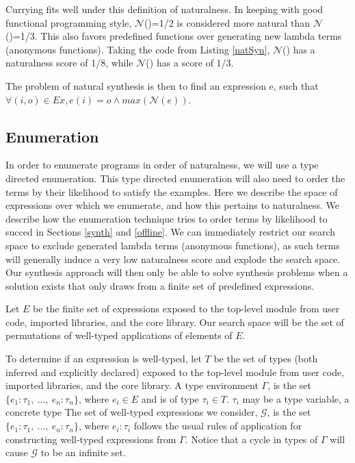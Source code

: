 Currying fits well under this definition of naturalness.
In keeping with good functional programming style, $\mathcal{N}$()=1/2 is considered more natural than $\mathcal{N}$()=1/3.
This also favors predefined functions over generating new lambda terms (anonymous functions).
Taking the code from Listing \ref{natSyn}, $\mathcal{N}$() has a naturalness score of 1/8, while $\mathcal{N}$() has a score of 1/3.

The problem of natural synthesis is then to find an expression e, such that $\forall (i,o) \in Ex, e (i) = o \land max(\mathcal{N}(e))$.


\subsection{Enumeration}
In order to enumerate programs in order of naturalness, we will use a type directed enumeration.
This type directed enumeration will also need to order the terms by their likelihood to satisfy the examples.
Here we describe the space of expressions over which we enumerate, and how this pertains to naturalness.
We describe how the enumeration technique tries to order terms by likelihood to succed in Sections \ref{synth} and \ref{offline}.
We can immediately restrict our search space to exclude generated lambda terms (anonymous functions), as such terms will generally induce a very low naturalness score and explode the search space.
Our synthesis approach will then only be able to solve synthesis problems when a solution exists that only draws from a finite set of predefined expressions.

Let $E$ be the finite set of expressions exposed to the top-level module from user code, imported libraries, and the core library.
Our search space will be the set of permutations of well-typed applications of elements of $E$.

To determine if an expression is well-typed, let $T$ be the set of types (both inferred and explicitly declared) exposed to the top-level module from user code, imported libraries, and the core library.
A type environment $\Gamma$, is the set $\{e_1 : \tau_1,\ ...,\ e_n : \tau_n\}$, where $e_{i} \in E$ and is of type $\tau_i \in T$.
$\tau_i$ may be a type variable, a concrete type
The set of well-typed expressions we consider, $\mathcal{G}$, is the set $\{e_1 : \tau_1,\ ...,\ e_n : \tau_n\}$, where $e_i : \tau_i$ follows the usual rules of application for constructing well-typed expressions from $\Gamma$.
Notice that a cycle in types of $\Gamma$ will cause $\mathcal{G}$ to be an infinite set.

